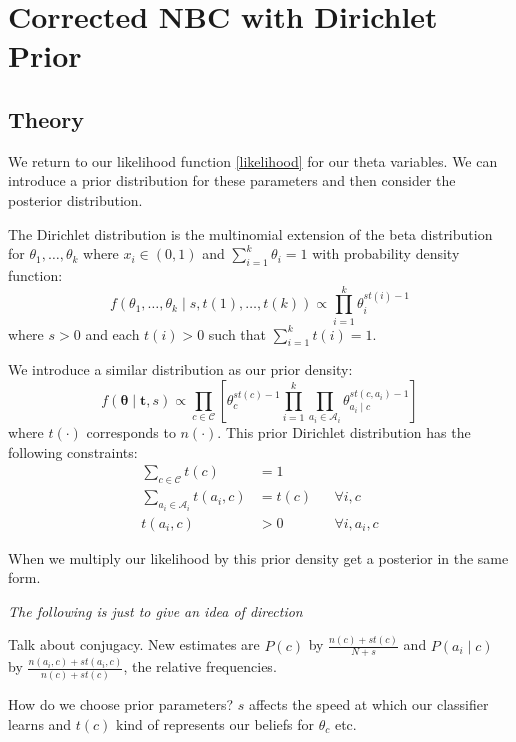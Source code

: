\chapter{Corrected NBC with Dirichlet Prior}

\section{Theory}

We return to our likelihood function \cref{likelihood} for our theta variables.
We can introduce a prior distribution for these parameters and then consider the posterior distribution.

The Dirichlet distribution is the multinomial extension of the beta distribution for $\theta_1,\dots,\theta_k$ where $x_i \in (0,1)$ and $\sum_{i=1}^k \theta_i = 1$ with probability density function:
\begin{equation} \label{dirichlet_pdf}
	f(\theta_1,\dots,\theta_k \mid s, t(1),\dots,t(k)) \propto \prod_{i=1}^k \theta_i^{st(i) - 1}
\end{equation}
where $s > 0$ and each $t(i)>0$ such that $\sum_{i=1}^{k}t(i) = 1$.

We introduce a similar distribution as our prior density:
\begin{equation} \label{prior}
	f(\mathbf{\theta} \mid \mathbf{t}, s) \propto \prod_{c \in \mathcal{C}} \left[ \theta_c^{st(c) - 1} \prod_{i=1}^k \prod_{a_i \in \mathcal{A}_i} \theta_{a_i \mid c}^{st(c, a_i) - 1} \right]
\end{equation}
where $t(\cdot)$ corresponds to $n(\cdot)$.
This prior Dirichlet distribution \cite{Zaffalon01} has the following constraints:
\begin{align}
	\sum_{c \in \mathcal{C}} t(c) & = 1 \\
	\sum_{a_i \in \mathcal{A}_i} t(a_i, c) & = t(c) && \forall i, c \\
	t(a_i, c) & > 0 && \forall i, a_i, c
\end{align}

When we multiply our likelihood by this prior density get a posterior in the same form.

\textit{The following is just to give an idea of direction}

Talk about conjugacy.
New estimates are $P(c)$ by $\frac{n(c) + st(c)}{N + s}$ and $P(a_i \mid c)$ by $\frac{n(a_i, c) + st(a_i,c)}{n(c)+st(c)}$, the relative frequencies.

How do we choose prior parameters? $s$ affects the speed at which our classifier learns and $t(c)$ kind of represents our beliefs for $\theta_c$ etc.

